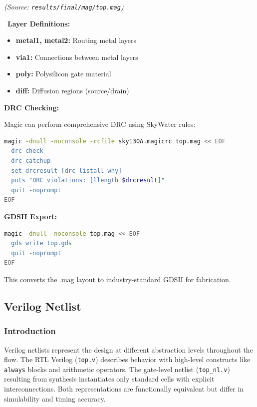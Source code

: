 \documentclass[12pt,a4paper]{article}
\begin{document}
\textit{(Source: \texttt{results/final/mag/top.mag})}

\
\textbf{Layer Definitions:}

\begin{itemize}
    \item \textbf{metal1, metal2:} Routing metal layers
    \item \textbf{via1:} Connections between metal layers
    \item \textbf{poly:} Polysilicon gate material
    \item \textbf{diff:} Diffusion regions (source/drain)
\end{itemize}

\textbf{DRC Checking:}

Magic can perform comprehensive DRC using SkyWater rules:

\begin{lstlisting}[language=bash,caption={Running DRC in Magic}]
magic -dnull -noconsole -rcfile sky130A.magicrc top.mag << EOF
  drc check
  drc catchup
  set drcresult [drc listall why]
  puts "DRC violations: [llength $drcresult]"
  quit -noprompt
EOF
\end{lstlisting}

\textbf{GDSII Export:}

\begin{lstlisting}[language=bash,caption={Generating GDSII from Magic}]
magic -dnull -noconsole top.mag << EOF
  gds write top.gds
  quit -noprompt
EOF
\end{lstlisting}

This converts the .mag layout to industry-standard GDSII for fabrication.

\newpage

\subsection{Verilog Netlist}

\subsubsection{Introduction}

Verilog netlists represent the design at different abstraction levels throughout the flow. The RTL Verilog (\texttt{top.v}) describes behavior with high-level constructs like \texttt{always} blocks and arithmetic operators. The gate-level netlist (\texttt{top\_nl.v}) resulting from synthesis instantiates only standard cells with explicit interconnections. Both representations are functionally equivalent but differ in simulability and timing accuracy.
\end{document}
